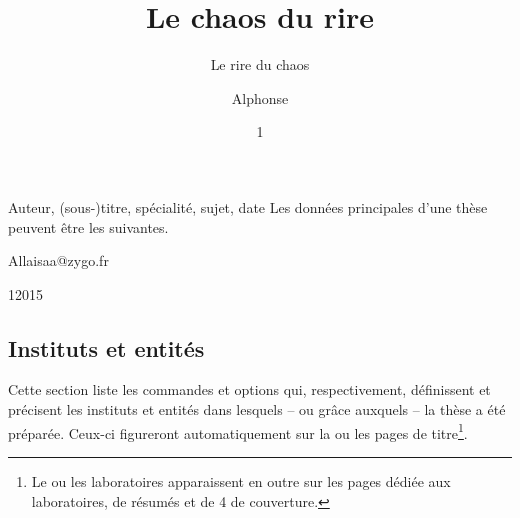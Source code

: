 \begin{dbexample}{Auteur, (sous-)titre, spécialité, sujet, date}{}
  Les données principales d'une thèse peuvent être les suivantes.
  \NoAutoSpacing%
\begin{bodycode}[listing options={deletekeywords={[2]title}}]
\author{Alphonse}{Allais}{aa@zygo.fr}
\title[Laugh's Chaos]{Le chaos du rire}
\subtitle[Chaos' laugh]{Le rire du chaos}
\date{1}{1}{2015}
\subject{Rire chaotique}
\end{bodycode}
\end{dbexample}

\subsection{Instituts et entités}\label{sec:entites}

Cette section liste les commandes et options qui, respectivement, définissent
et précisent les instituts et entités dans lesquels -- ou grâce auxquels -- la
thèse a été préparée. Ceux-ci figureront automatiquement sur la ou les pages de
titre\footnote{Le ou les laboratoires apparaissent en outre sur les pages
  dédiée aux laboratoires, de résumés et de 4\ieme{} de couverture.}.

